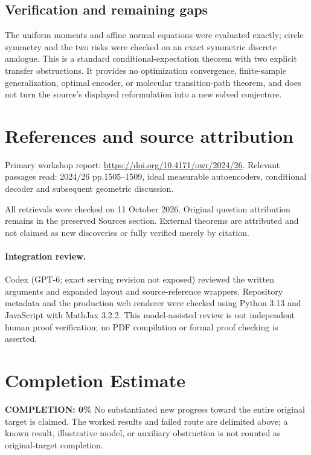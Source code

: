 \documentclass[11pt]{article}
\begin{document}
\subsection{Verification and remaining gaps}
The uniform moments and affine normal equations were evaluated exactly; circle symmetry and the two risks were checked on an exact symmetric discrete analogue. This is a standard conditional-expectation theorem with two explicit transfer obstructions. It provides no optimization convergence, finite-sample generalization, optimal encoder, or molecular transition-path theorem, and does not turn the source's displayed reformulation into a new solved conjecture.

\section{References and source attribution}
Primary workshop report: \url{https://doi.org/10.4171/owr/2024/26}. Relevant passages read: 2024/26 pp.1505--1509, ideal measurable autoencoders, conditional decoder and subsequent geometric discussion.

All retrievals were checked on 11 October 2026. Original question attribution remains in the preserved Sources section. External theorems are attributed and not claimed as new discoveries or fully verified merely by citation.


\paragraph{Integration review.} Codex (GPT-6; exact serving revision not exposed) reviewed the written arguments and expanded layout and source-reference wrappers. Repository metadata and the production web renderer were checked using Python 3.13 and JavaScript with MathJax 3.2.2. This model-assisted review is not independent human proof verification; no PDF compilation or formal proof checking is asserted.

\section{Completion Estimate}
\noindent\textbf{COMPLETION: 0\%}
No substantiated new progress toward the entire original target is claimed. The worked results and failed route are delimited above; a known result, illustrative model, or auxiliary obstruction is not counted as original-target completion.
\end{document}
